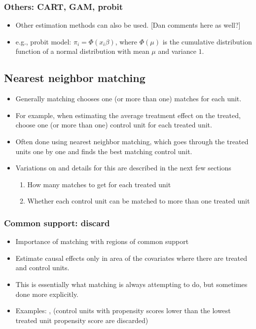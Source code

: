 \documentclass[11pt,titlepage]{article}
\begin{document}
\subsubsection{Others: CART, GAM, probit}
\begin{itemize}
\item Other estimation methods can also be used.  [Dan comments here as well?]
\item e.g., probit model: $\pi_i = \Phi(x_i \beta)$, where $\Phi(\mu)$ is the cumulative distribution function of a normal distribution with mean $\mu$ and variance $1$.
\end{itemize}

\subsection{Nearest neighbor matching}
\label{nearest}
\begin{itemize}
\item Generally matching chooses one (or more than one) matches for each unit.  
\item For example, when estimating the average treatment effect on the treated, choose one (or more than one) control unit for each treated unit. 
\item Often done using nearest neighbor matching, which goes through the treated units one by one and finds the best matching control unit. 
\item Variations on and details for this are described in the next few sections
\begin{enumerate} \item  How many matches to get for each treated unit
                  \item  Whether each control unit can be matched to more than one treated unit
\end{enumerate}
\end{itemize}

\subsubsection{Common support: discard}
\begin{itemize}
\item Importance of matching with regions of common support
\item Estimate causal effects only in area of the covariates where there are treated and control units.  
\item This is essentially what matching is always attempting to do, but sometimes done more explicitly.
\item Examples: \cite{KinZen02}, \cite{DehWah99} (control units with propensity 
scores lower than the lowest treated unit propensity score are discarded)
\end{itemize} 
\end{document}
